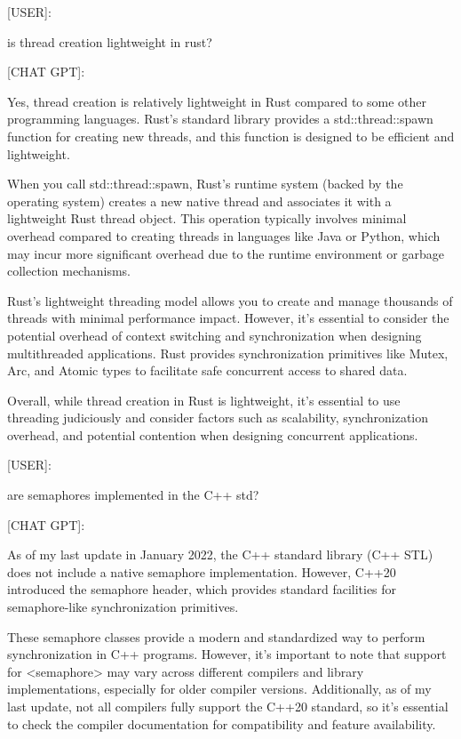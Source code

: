 [USER]:

is thread creation lightweight in rust?

[CHAT GPT]:

Yes, thread creation is relatively lightweight in Rust compared to some other programming languages. Rust's standard library provides a std::thread::spawn function for creating new threads, and this function is designed to be efficient and lightweight.

When you call std::thread::spawn, Rust's runtime system (backed by the operating system) creates a new native thread and associates it with a lightweight Rust thread object. This operation typically involves minimal overhead compared to creating threads in languages like Java or Python, which may incur more significant overhead due to the runtime environment or garbage collection mechanisms.

Rust's lightweight threading model allows you to create and manage thousands of threads with minimal performance impact. However, it's essential to consider the potential overhead of context switching and synchronization when designing multithreaded applications. Rust provides synchronization primitives like Mutex, Arc, and Atomic types to facilitate safe concurrent access to shared data.

Overall, while thread creation in Rust is lightweight, it's essential to use threading judiciously and consider factors such as scalability, synchronization overhead, and potential contention when designing concurrent applications.

[USER]:

are semaphores implemented in the C++ std?

[CHAT GPT]:

As of my last update in January 2022, the C++ standard library (C++ STL) does not include a native semaphore implementation. However, C++20 introduced the semaphore header, which provides standard facilities for semaphore-like synchronization primitives.

These semaphore classes provide a modern and standardized way to perform synchronization in C++ programs. However, it's important to note that support for <semaphore> may vary across different compilers and library implementations, especially for older compiler versions. Additionally, as of my last update, not all compilers fully support the C++20 standard, so it's essential to check the compiler documentation for compatibility and feature availability.

